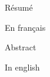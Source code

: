 \blankpage
\vfill

\begin{center}
{\strong Résumé}
\end{center}

{
\footnotesize

En français

}

\vspace{2cm}

\begin{center}
{\strong Abstract}
\end{center}

{
\footnotesize

In english

}

\vfill
